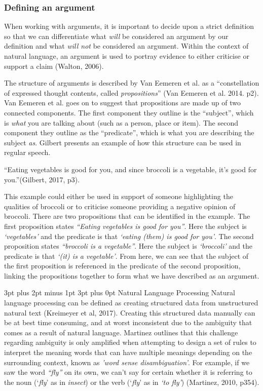 \documentclass[12pt,a4paper]{article}
\makeatletter
\renewcommand\subsection{\@startsection {subsection}{1}{2mm} %
                               {3pt plus 2pt minus 1pt} %
                               {3pt plus 0pt} %
                               {\normalfont\bfseries}}
\makeatother
\begin{document}
\subsubsection{Defining an argument}
When working with arguments, it is important to decide upon a strict definition so that we can differentiate what \emph{will} be considered an argument by our definition and what \emph{will not} be considered an argument. Within the context of natural language, an argument is used to portray evidence to either criticise or support a claim (Walton, 2006). 

The structure of arguments is described by Van Eemeren et al. as a ``constellation of expressed thought contents, called \emph{propositions}'' (Van Eemeren et al. 2014. p2). Van Eemeren et al. goes on to suggest that propositions are made up of two connected components. The first component they outline is the ``subject'', which is \emph{what} you are talking about (such as a person, place or item). The second component they outline as the ``predicate'', which is what you are describing the subject \emph{as}. Gilbert presents an example of how this structure can be used in regular speech.

``Eating vegetables is good for you, and since broccoli is a vegetable, it's good for you.''(Gilbert, 2017, p3).

This example could either be used in support of someone highlighting the qualities of broccoli or to criticise someone providing a negative opinion of broccoli. There are two propositions that can be identified in the example. The first proposition states \emph{``Eating vegetables is good for you''}. Here the subject is \emph{`vegetables'} and the predicate is that \emph{`eating (them) is good for you'}. The second proposition states \emph{``broccoli is a vegetable''}. Here the subject is \emph{`broccoli'} and the predicate is that \emph{`(it) is a vegetable'}.  From here, we can see that the subject of the first proposition is referenced in the predicate of the second proposition, linking the propositions together to form what we have described as an argument.

\subsection{Natural Language Processing}
Natural language processing can be defined as creating structured data from unstructured natural text (Kreimeyer et al, 2017). Creating this structured data manually can be at best time consuming, and at worst inconsistent due to the ambiguity that comes as a result of natural language. Martinez outlines that this challenge regarding ambiguity is only amplified when attempting to design a set of rules to interpret the meaning words that can have multiple meanings depending on the surrounding context, known as \emph{'word sense disambiguation'}. For example, if we saw the word \emph{``fly''} on its own, we can't say for certain whether it is referring to the noun (`\emph{fly}' as in \emph{insect}) or the verb (`\emph{fly}' as in \emph{`to fly'}) (Martinez, 2010, p354).\newline
\end{document}
